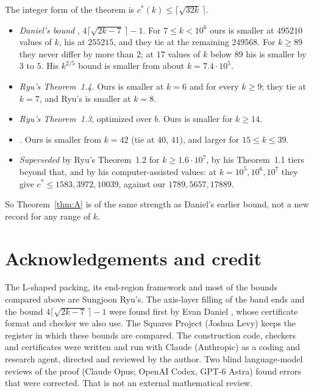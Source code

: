 \documentclass[11pt,letterpaper]{amsart}
\theoremstyle{plain}
\theoremstyle{remark}
\newcommand{\cs}{c^{*}}
\begin{document}
The integer form of the theorem is $\cs(k)\le\lceil\sqrt{32k}\,\rceil$.
\begin{itemize}
\item \emph{Daniel's bound} \cite{Dan26b}, $4\lceil\sqrt{2k-7}\,\rceil-1$. For $7\le k<10^6$ ours is smaller at $495210$ values of $k$, his at $255215$, and they tie at the remaining $249568$. For $k\ge89$ they never differ by more than $2$; at $17$ values of $k$ below $89$ his is smaller by $3$ to $5$. His $k^{2/5}$ bound is smaller from about $k=7.4\cdot10^5$.
\item \emph{Ryu's Theorem~1.4.} Ours is smaller at $k=6$ and for every $k\ge9$; they tie at $k=7$, and Ryu's is smaller at $k=8$.
\item \emph{Ryu's Theorem~1.3}, optimized over $b$. Ours is smaller for $k\ge14$.
\item \emph{\cite{Fan26a}.} Ours is smaller from $k=42$ (tie at $40$, $41$), and larger for $15\le k\le39$.
\item \emph{Superseded} by Ryu's Theorem~1.2 for $k\ge1.6\cdot10^7$, by his Theorem~1.1 tiers beyond that, and by his computer-assisted values: at $k=10^5,10^6,10^7$ they give $\cs\le1583,3972,10039$, against our $1789,5657,17889$.
\end{itemize}
So Theorem~\ref{thm:A} is of the same strength as Daniel's earlier bound, not a new record for any range of $k$.

\section*{Acknowledgements and credit}

The L-shaped packing, its end-region framework and most of the bounds compared above are Sungjoon Ryu's. The axis-layer filling of the band ends and the bound $4\lceil\sqrt{2k-7}\,\rceil-1$ were found first by Evan Daniel \cite{Dan26b}, whose certificate format and checker we also use. The Squares Project (Joshua Levy) keeps the register in which these bounds are compared. The construction code, checkers and certificates were written and run with Claude (Anthropic) as a coding and research agent, directed and reviewed by the author. Two blind language-model reviews of the proof (Claude Opus; OpenAI Codex, GPT-6 Astra) found errors that were corrected. That is not an external mathematical review.
\end{document}
